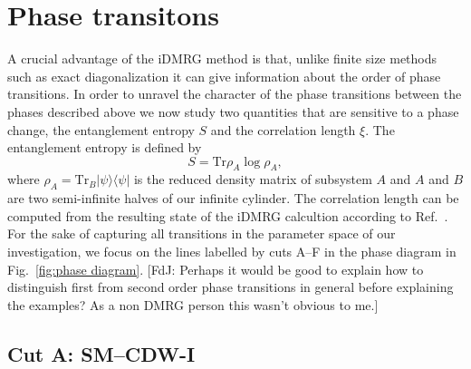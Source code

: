 \documentclass[aps,prx,10pt,twocolumn,floatfix,superscriptaddress,showpacs,numerical,footinbib]{revtex4-1}
\newcommand{\ket}[1]{| #1 \rangle}
\newcommand{\bra}[1]{\langle #1 |}
\newcommand{\noteFdJ}[1]{{\color{cyan} [FdJ: #1]}}
\begin{document}
\section{\label{sec:phasetransitions} Phase transitons}
%
A crucial advantage of the iDMRG method is that, unlike finite
size methods such as exact diagonalization it can give information about the order of phase transitions.
%
In order to unravel the character of the phase transitions between
the phases described above we now study two quantities that are sensitive
to a phase change, the entanglement entropy $S$ and the correlation length $\xi$.
%
The entanglement entropy is defined by
%
\begin{equation}
 S = \mathrm{Tr} \rho_A \log \rho_A,
\end{equation}
%
where $\rho_A = \mathrm{Tr}_B \ket{\psi}\bra{\psi}$ is the reduced density matrix of subsystem $A$ and $A$ and $B$ are two semi-infinite halves of our infinite cylinder.
%
The correlation length can be computed from the resulting state of the iDMRG calcultion according to Ref.~\cite{KZM13}.
%
For the sake of capturing all transitions in the parameter space of our investigation, we focus on the lines labelled by cuts A--F in the phase diagram in Fig.~\ref{fig:phase diagram}.
%
\noteFdJ{Perhaps it would be good to explain how to distinguish first from second order phase transitions in general before explaining the examples? As a non DMRG person this wasn't obvious to me.}

\subsection{Cut A: SM--CDW-I}
\end{document}
